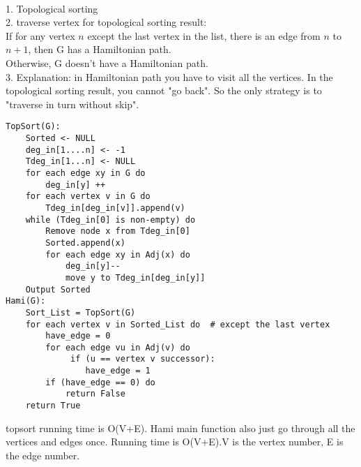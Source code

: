 \documentclass[12pt,a4paper]{article}
\newcommand{\question}[1]{\bigskip\noindent{\textbf{Q{#1} solution}}}
\begin{document}
\question{23.A}\\
1. Topological sorting
\\2. traverse vertex for topological sorting result:
\\If for any vertex $n$ except the last vertex in the list, there is an edge from $n$ to $n+1$, then G has a Hamiltonian path.
\\Otherwise, G doesn't have a Hamiltonian path.
\\3. Explanation: in Hamiltonian path you have to visit all the vertices. In the topological sorting result, you cannot "go back". So the only strategy is to "traverse in turn without skip". 
\begin{lstlisting}
TopSort(G):
	Sorted <- NULL
	deg_in[1....n] <- -1
	Tdeg_in[1...n] <- NULL
	for each edge xy in G do
		deg_in[y] ++
	for each vertex v in G do
		Tdeg_in[deg_in[v]].append(v)
	while (Tdeg_in[0] is non-empty) do
		Remove node x from Tdeg_in[0]
		Sorted.append(x)
		for each edge xy in Adj(x) do
			deg_in[y]--
			move y to Tdeg_in[deg_in[y]]
	Output Sorted
Hami(G):
	Sort_List = TopSort(G)
	for each vertex v in Sorted_List do  # except the last vertex
		have_edge = 0
		for each edge vu in Adj(v) do
			 if (u == vertex v successor): 
				have_edge = 1	
		if (have_edge == 0) do
			return False
	return True

\end{lstlisting}
topsort running time is O(V+E). Hami main function also just go through all the vertices and edges once. Running time is O(V+E).V is the vertex number, E is the edge number.\\
\end{document}
